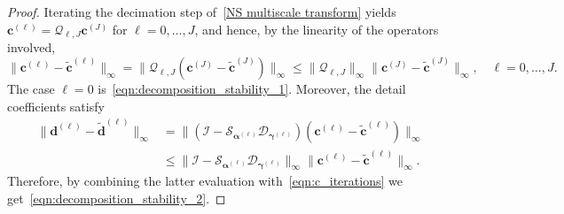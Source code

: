 \documentclass[11pt,a4paper]{article}
\theoremstyle{definition}
\begin{document}
\begin{proof}
    Iterating the decimation step of~\eqref{NS multiscale transform} yields $\boldsymbol{c}^{(\ell)}=\mathcal{Q}_{\ell,J}\boldsymbol{c}^{(J)}$ for $\ell=0,\dots,J$, and hence, by the linearity of the operators involved,
    \begin{equation}\label{eqn:c_iterations}
        \|\boldsymbol{c}^{(\ell)}-\widetilde{\boldsymbol{c}}^{(\ell)}\|_\infty = \|\mathcal{Q}_{\ell,J}(\boldsymbol{c}^{(J)}-\widetilde{\boldsymbol{c}}^{(J)})\|_\infty\leq \|\mathcal{Q}_{\ell,J}\|_\infty\|\boldsymbol{c}^{(J)}-\widetilde{\boldsymbol{c}}^{(J)}\|_\infty, \quad \ell=0,\dots,J.
    \end{equation}
    The case $\ell=0$ is~\eqref{eqn:decomposition_stability_1}. Moreover, the detail coefficients satisfy
    \begin{equation*}
    \begin{split}
        \|\boldsymbol{d}^{(\ell)}-\widetilde{\boldsymbol{d}}^{(\ell)}\|_\infty & = \|(\mathcal{I}-\mathcal{S}_{\boldsymbol{\alpha}^{(\ell)}}\mathcal{D}_{\boldsymbol{\gamma}^{(\ell)}})(\boldsymbol{c}^{(\ell)}-\widetilde{\boldsymbol{c}}^{(\ell)})\|_\infty\\
        & \leq \|\mathcal{I}-\mathcal{S}_{\boldsymbol{\alpha}^{(\ell)}}\mathcal{D}_{\boldsymbol{\gamma}^{(\ell)}}\|_\infty \|\boldsymbol{c}^{(\ell)}-\widetilde{\boldsymbol{c}}^{(\ell)}\|_\infty.
    \end{split}
    \end{equation*}
    Therefore, by combining the latter evaluation with~\eqref{eqn:c_iterations} we get~\eqref{eqn:decomposition_stability_2}.
\end{proof}
\end{document}
